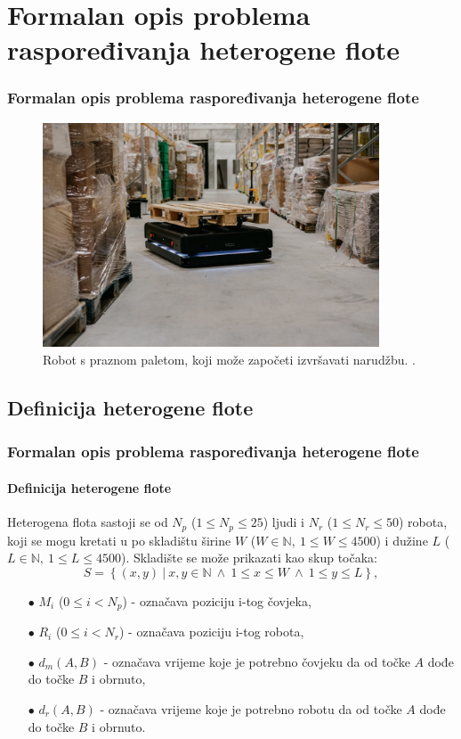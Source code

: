 \documentclass{beamer}
\begin{document}
\section{Formalan opis problema raspoređivanja heterogene flote}
\begin{frame}
\frametitle{Formalan opis problema raspoređivanja heterogene flote}
\begin{figure}[htb]
    \centering
    \includegraphics[width=10cm]{images/robot-02.jpg}
    \caption{Robot s praznom paletom, koji može započeti izvršavati narudžbu. \citep{Gideon:PollDebunks}.}
\end{figure}
\end{frame}

\subsection{Definicija heterogene flote}
\begin{frame}
\frametitle{Formalan opis problema raspoređivanja heterogene flote}
\framesubtitle{Definicija heterogene flote}
Heterogena flota sastoji se od $N_p$ ($1 \le N_p \le 25$) ljudi i
 $N_r$ ($1 \le N_r \le 50$) robota,
koji se mogu kretati u po skladištu širine $W$ ($W \in \mathbb{N},\ 1 \le W \le 4500$)
i  dužine $L$ ($L \in \mathbb{N},\ 1 \le L \le 4500$).
Skladište se može prikazati kao skup točaka:
\begin{equation}
S = \left\{(x, y)\ |\ x, y \in \mathbb{N}\ \land\ 1 \le x \le W\ \land\ 1 \le y \le L\right\},
\end{equation}
\begin{itemize}
    \item[$\bullet$] $M_i$ ($0 \le i < N_p$) - označava poziciju i-tog čovjeka,
    \item[$\bullet$] $R_i$ ($0 \le i < N_r$) - označava poziciju i-tog robota,
    \item[$\bullet$] $d_m(A, B)$ - označava vrijeme koje je potrebno čovjeku da od točke $A$ dođe do točke $B$ i obrnuto,
    \item[$\bullet$] $d_r(A, B)$ - označava vrijeme koje je potrebno robotu da od točke $A$ dođe do točke $B$ i obrnuto.
\end{itemize}
\end{frame}
\end{document}
